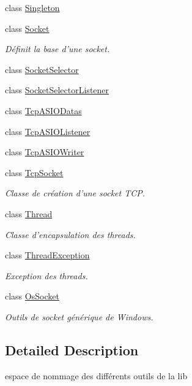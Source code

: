 \begin{DoxyCompactItemize}
class \hyperlink{classmognetwork_1_1_singleton}{Singleton}
\item 
class \hyperlink{classmognetwork_1_1_socket}{Socket}
\begin{DoxyCompactList}\small\item\em Définit la base d'une socket. \end{DoxyCompactList}\item 
class \hyperlink{classmognetwork_1_1_socket_selector}{Socket\-Selector}
\item 
class \hyperlink{classmognetwork_1_1_socket_selector_listener}{Socket\-Selector\-Listener}
\item 
class \hyperlink{classmognetwork_1_1_tcp_a_s_i_o_datas}{Tcp\-A\-S\-I\-O\-Datas}
\item 
class \hyperlink{classmognetwork_1_1_tcp_a_s_i_o_listener}{Tcp\-A\-S\-I\-O\-Listener}
\item 
class \hyperlink{classmognetwork_1_1_tcp_a_s_i_o_writer}{Tcp\-A\-S\-I\-O\-Writer}
\item 
class \hyperlink{classmognetwork_1_1_tcp_socket}{Tcp\-Socket}
\begin{DoxyCompactList}\small\item\em Classe de création d'une socket T\-C\-P. \end{DoxyCompactList}\item 
class \hyperlink{classmognetwork_1_1_thread}{Thread}
\begin{DoxyCompactList}\small\item\em Classe d'encapsulation des threads. \end{DoxyCompactList}\item 
class \hyperlink{classmognetwork_1_1_thread_exception}{Thread\-Exception}
\begin{DoxyCompactList}\small\item\em Exception des threads. \end{DoxyCompactList}\item 
class \hyperlink{classmognetwork_1_1_os_socket}{Os\-Socket}
\begin{DoxyCompactList}\small\item\em Outils de socket générique de Windows. \end{DoxyCompactList}\end{DoxyCompactItemize}


\subsection{Detailed Description}
espace de nommage des différents outils de la lib 